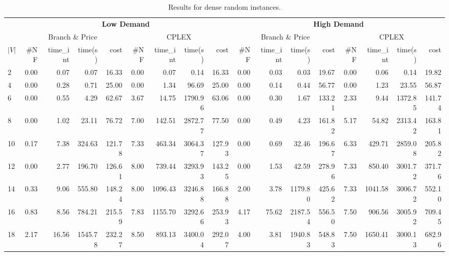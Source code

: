 \documentclass[conference]{IEEEtran}
\begin{document}
\begin{table*}[h]
\begin{center}
\caption{Results for dense random instances.}\label{tab:dense}
\begin{tabular} {l | r r r r | r r r r | r r r r | r r r r }
\hline
      &  \multicolumn{8}{c|}{ \textbf{Low Demand} } & \multicolumn{8}{c}{ \textbf{High Demand}} \\
      &  \multicolumn{4}{c|}{Branch \& Price} & \multicolumn{4}{c|}{CPLEX}    &       \multicolumn{4}{c|}{Branch \& Price} & \multicolumn{4}{c}{CPLEX}               \\  
$|V|$ & \#NF &  time\_int    &  time(s)       &  cost          &  \#NF &  time\_int  &  time(s)       &  cost  & \#NF &  time\_int    &  time(s)       &  cost          &  \#NF &  time\_int  &  time(s)       &  cost \\
\hline      
2&     0.00  &   0.07    &   0.07     &   16.33   & 0.00 & 0.07 & 0.14 & 16.33         &    0.00  &   0.03    &   0.03     &   19.67    & 0.00 & 0.06 & 0.14 & 19.82              \\  
4&     0.00  &   0.28    &   0.71     &   25.00   & 0.00 & 1.34 & 96.69 & 25.00        &    0.00  &   0.14    &   0.44     &   56.77    & 0.00 & 1.23 & 23.55 & 56.87             \\
6&     0.00  &   0.55    &   4.29     &   62.67   & 3.67 & 14.75 & 1790.96 & 63.06     &    0.00  &   0.30    &   1.67     &   133.21   & 2.33 & 9.44 & 1372.85 & 141.74       \\
8&     0.00  &   1.02    &   23.11    &   76.72   & 7.00 & 142.51 & 2872.77 & 77.50    &    0.00  &   0.49    &   4.23     &   161.82   & 5.17 & 54.82 & 2313.42 & 163.81       \\
10&    0.17  &   7.38    &   324.63   &   121.78  & 7.33 & 463.34 & 3064.37 & 127.93   &    0.00  &   0.69    &   32.46    &   196.67   & 6.33 & 429.71 & 2859.08 & 205.82     \\
12&    0.00  &   2.77    &   196.70   &   126.61  & 8.00 & 739.44 & 3293.93 & 143.25   &    0.00  &   1.53    &   42.59    &   278.96   & 7.33 & 850.40 & 3001.72 & 371.76    \\
14&    0.33  &   9.06    &   555.80   &   148.24  & 8.00 & 1096.43 & 3246.88 & 166.88  &    2.00  &   3.78    &   1179.80  &   425.62   & 7.33 & 1041.58 & 3006.72 & 552.10   \\
16&    0.83  &   8.56    &   784.21   &   215.59  & 7.83  & 1155.70 & 3292.66 & 253.93 &    4.17  &   75.62   &   2187.54  &   556.50   & 7.50 & 906.56 & 3005.92 & 709.45   \\
18&    2.17  &   16.56   &   1545.78  &   232.27  & 8.50 & 893.13 & 3400.04 & 292.07   &    4.00  &   3.81    &   1940.83  &   548.83   & 7.50 & 1650.41 & 3000.13 & 682.96   \\ 
\hline
\end{tabular} 
\end{center}
\end{table*}
\end{document}

